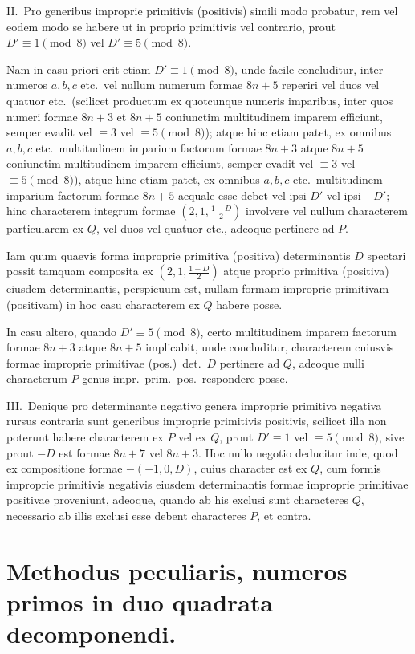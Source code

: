 \documentclass[12pt,a4paper]{article}
\theoremstyle{plain}
\theoremstyle{definition}
\theoremstyle{remark}
\begin{document}
\textsc{II.}\ Pro generibus improprie primitivis (positivis) simili modo probatur, rem vel eodem modo se habere ut in proprio primitivis vel contrario, prout $D' \equiv 1 \pmod{8}$ vel $D' \equiv 5 \pmod{8}$.

Nam in casu priori erit etiam $D' \equiv 1 \pmod{8}$, unde facile concluditur, inter numeros $a,b,c$ etc.\ vel nullum numerum formae $8n+5$ reperiri vel duos vel quatuor etc.\ (scilicet productum ex quotcunque numeris imparibus, inter quos numeri formae $8n+3$ et $8n+5$ coniunctim multitudinem imparem efficiunt, semper evadit vel $\equiv 3$ vel $\equiv 5 \pmod{8}$); atque hinc etiam patet, ex omnibus $a,b,c$ etc.\ multitudinem imparium factorum formae $8n+3$ atque $8n+5$ coniunctim multitudinem imparem efficiunt, semper evadit vel $\equiv 3$ vel $\equiv 5 \pmod{8}$), atque hinc etiam patet, ex omnibus $a,b,c$ etc.\ multitudinem imparium factorum formae $8n+5$ aequale esse debet vel ipsi $D'$ vel ipsi $-D'$; hinc characterem integrum formae $(2,1,\frac{1-D}{2})$ involvere vel nullum characterem particularem ex $Q$, vel duos vel quatuor etc., adeoque pertinere ad $P$.

Iam quum quaevis forma improprie primitiva (positiva) determinantis $D$ spectari possit tamquam composita ex $(2,1,\frac{1-D}{2})$ atque proprio primitiva (positiva) eiusdem determinantis, perspicuum est, nullam formam improprie primitivam (positivam) in hoc casu characterem ex $Q$ habere posse.

In casu altero, quando $D' \equiv 5 \pmod{8}$, certo multitudinem imparem factorum formae $8n+3$ atque $8n+5$ implicabit, unde concluditur, characterem cuiusvis formae improprie primitivae (pos.)\ det.\ $D$ pertinere ad $Q$, adeoque nulli characterum $P$ genus impr.\ prim.\ pos.\ respondere posse.

\textsc{III.}\ Denique pro determinante negativo genera improprie primitiva negativa rursus contraria sunt generibus improprie primitivis positivis, scilicet illa non poterunt habere characterem ex $P$ vel ex $Q$, prout $D' \equiv 1$ vel $\equiv 5 \pmod{8}$, sive prout $-D$ est formae $8n+7$ vel $8n+3$. Hoc nullo negotio deducitur inde, quod ex compositione formae $-(-1,0,D)$, cuius character est ex $Q$, cum formis improprie primitivis negativis eiusdem determinantis formae improprie primitivae positivae proveniunt, adeoque, quando ab his exclusi sunt characteres $Q$, necessario ab illis exclusi esse debent characteres $P$, et contra.

\section*{Methodus peculiaris, numeros primos in duo quadrata decomponendi.}
\end{document}
